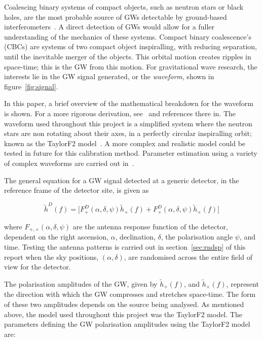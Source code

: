 \documentclass{jpconf}
\newcommand{\gws}{\tilde{h}}
\begin{document}
 Coalescing binary systems of compact objects, such as neutron stars or black holes, are the most probable source of GWs detectable by ground-based interferometers~\cite{peadvanced}. A direct detection of GWs would allow for a fuller understanding of the mechanics of these systems. Compact binary coalescence's (CBCs) are systems of two compact object inspiralling, with reducing separation, until the inevitable merger of the objects. This orbital motion creates ripples in space-time; this is the GW from this motion. For gravitational wave research, the interests lie in the GW signal generated, or the \textit{waveform}, shown in figure~\ref{fig:signal}. 

  


In this paper, a brief overview of the mathematical breakdown for the waveform is shown. For a more rigorous derivation, see~\cite{SathSchutz} and references there in. The waveform used throughout this project is a simplified system where the neutron stars are non rotating about their axes, in a perfectly circular inspiralling orbit; known as the TaylorF2 model~\cite{TF2,pN}. A more complex and realistic model could be tested in future for this calibration method. Parameter estimation using a variety of complex waveforms are carried out in~\cite{peadvanced}.




The general equation for a GW signal detected at a generic detector, in the reference frame of the detector site, is given as~\cite{SathSchutz}


\begin{equation}
  \label{eq:gravsig}
   \gws^D(f) = \big[ F_{+}^D(\alpha, \delta, \psi)\gws_{+}(f) + F_{\times}^D(\alpha, \delta, \psi)\gws_{\times}(f)\big]
\end{equation}

where $F_{+,\times}(\alpha, \delta, \psi)$ are the antenna response function of the detector, dependent on the right ascension, $\alpha$, declination, $\delta$, the polarisation angle $\psi$, and time. Testing the antenna patterns is carried out in section~\ref{sec:rndsp} of this report when the sky positions, $(\alpha, \delta)$, are randomised across the entire field of view for the detector. 

The polarisation amplitudes of the GW, given by $\gws_{+}(f)$, and $\gws_{\times}(f)$, represent the direction with which the GW compresses and stretches space-time. The form of these two amplitudes depends on the source being analysed. As mentioned above, the model used throughout this project was the TaylorF2 model. The parameters defining the GW polarisation amplitudes using the TaylorF2 model are:
\end{document}
